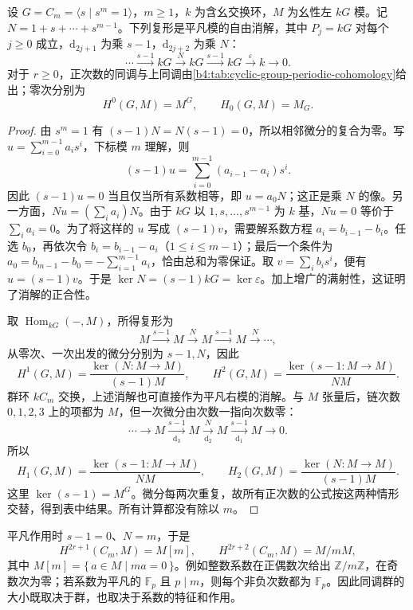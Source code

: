 \begin{theorem}[循环群的周期消解]\label{b4:thm:cyclic-group-cohomology}
	设 \(G=C_m=\langle s\mid s^m=1\rangle\)，\(m\ge1\)，\(k\) 为含幺交换环，\(M\) 为幺性左 \(kG\) 模。记 \(N=1+s+\cdots+s^{m-1}\)。下列复形是平凡模的自由消解，其中 \(P_j=kG\) 对每个 \(j\ge0\) 成立，\(\mathrm{d}_{2j+1}\) 为乘 \(s-1\)，\(\mathrm{d}_{2j+2}\) 为乘 \(N\)：
	\[
		\cdots\xrightarrow{s-1}kG\xrightarrow{N}kG \xrightarrow{s-1}kG\xrightarrow{\varepsilon}k\longrightarrow0.
	\]
	对于 \(r\ge0\)，正次数的同调与上同调由\cref{b4:tab:cyclic-group-periodic-cohomology}给出；零次分别为
	\[
		H^0(G,M)=M^G,\qquad H_0(G,M)=M_G.
	\]
\end{theorem}
\begin{proof}
	由 \(s^m=1\) 有 \((s-1)N=N(s-1)=0\)，所以相邻微分的复合为零。写 \(u=\sum_{i=0}^{m-1}a_i s^i\)，下标模 \(m\) 理解，则
	\[
		(s-1)u=\sum_{i=0}^{m-1}(a_{i-1}-a_i)s^i.
	\]
	因此 \((s-1)u=0\) 当且仅当所有系数相等，即 \(u=a_0N\)；这正是乘 \(N\) 的像。另一方面，\(Nu=(\sum_i a_i)N\)。由于 \(kG\) 以 \(1,s,\ldots,s^{m-1}\) 为 \(k\) 基，\(Nu=0\) 等价于 \(\sum_i a_i=0\)。为了将这样的 \(u\) 写成 \((s-1)v\)，需要解系数方程 \(a_i=b_{i-1}-b_i\)。任选 \(b_0\)，再依次令 \(b_i=b_{i-1}-a_i\)（\(1\le i\le m-1\)）；最后一个条件为 \(a_0=b_{m-1}-b_0=-\sum_{i=1}^{m-1}a_i\)，恰由总和为零保证。取 \(v=\sum_i b_i s^i\)，便有 \(u=(s-1)v\)。于是 \(\ker N=(s-1)kG=\ker\varepsilon\)。加上增广的满射性，这证明了消解的正合性。

	取 \(\operatorname{Hom}_{kG}(-,M)\)，所得复形为
	\[
		M\xrightarrow{s-1}M\xrightarrow{N}M\xrightarrow{s-1}M\xrightarrow{N}\cdots,
	\]
	从零次、一次出发的微分分别为 \(s-1,N\)，因此
	\[
		H^1(G,M)=\dfrac{\ker(N:M\to M)}{(s-1)M},\qquad H^2(G,M)=\dfrac{\ker(s-1:M\to M)}{NM}.
	\]
	群环 \(kC_m\) 交换，上述消解也可直接作为平凡右模的消解。与 \(M\) 张量后，链次数 \(0,1,2,3\) 上的项都为 \(M\)，但一次微分由次数一指向次数零：
	\[
		\cdots\longrightarrow M\xrightarrow[\mathrm{d}_3]{s-1}M \xrightarrow[\mathrm{d}_2]{N}M\xrightarrow[\mathrm{d}_1]{s-1}M\longrightarrow0.
	\]
	所以
	\[
		H_1(G,M)=\dfrac{\ker(s-1:M\to M)}{NM},\qquad H_2(G,M)=\dfrac{\ker(N:M\to M)}{(s-1)M}.
	\]
	这里 \(\ker(s-1)=M^G\)。微分每两次重复，故所有正次数的公式按这两种情形交替，得到表中结果。所有计算都没有除以 \(m\)。
\end{proof}



平凡作用时 \(s-1=0\)、\(N=m\)，于是
\[
	H^{2r+1}(C_m,M)=M[m],\qquad H^{2r+2}(C_m,M)=M/mM,
\]
其中 \(M[m]=\{\,a\in M\mid ma=0\,\}\)。例如整数系数在正偶数次给出 \(\mathbb Z/m\mathbb Z\)，在奇数次为零；若系数为平凡的 \(\mathbb F_p\) 且 \(p\mid m\)，则每个非负次数都为 \(\mathbb F_p\)。因此同调群的大小既取决于群，也取决于系数的特征和作用。

